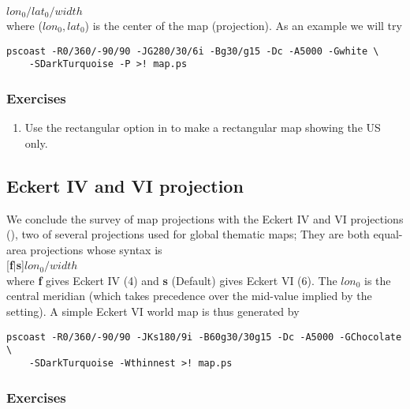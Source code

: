 \documentclass{report}
\begin{document}
$lon_0/lat_0/width$ \\

\noindent
where ($lon_0, lat_0$) is the center of the map (projection).
As an example we will try

\begin{verbatim}
pscoast -R0/360/-90/90 -JG280/30/6i -Bg30/g15 -Dc -A5000 -Gwhite \
    -SDarkTurquoise -P >! map.ps
\end{verbatim} 

\subsubsection{Exercises}

\begin{enumerate}

\item Use the rectangular option in  to make a rectangular map
showing the US only.

\end{enumerate}

\subsection{Eckert IV and VI projection}

We conclude the survey of map projections with the Eckert IV and VI projections
(\Opt{JK}), two of several projections used for global thematic maps; They
are both equal-area projections whose syntax is \\

[{\bf f$|$s}]$lon_0/width$ \\

\noindent
where {\bf f} gives Eckert IV (4) and {\bf s} (Default) gives Eckert VI (6).
The $lon_0$ is the central meridian (which takes precedence over
the mid-value implied by the \Opt{R} setting).  A simple Eckert VI world map
is thus generated by

\begin{verbatim}
pscoast -R0/360/-90/90 -JKs180/9i -B60g30/30g15 -Dc -A5000 -GChocolate \
    -SDarkTurquoise -Wthinnest >! map.ps
\end{verbatim}

\subsubsection{Exercises}
\end{document}
